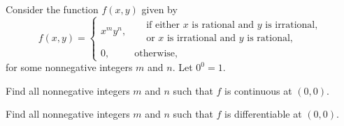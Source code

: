 \begin{problem}
Consider the function $f(x,y)$ given by
\[
f(x,y)=
\begin{cases}
x^m y^n, & \begin{aligned}&\text{if either $x$ is rational and $y$ is irrational,}\\[-0.15em]&\text{or $x$ is irrational and $y$ is rational,}\end{aligned}\\[0.8em]
0, & \text{otherwise},
\end{cases}
\]
for some nonnegative integers $m$ and $n$. Let $0^0=1$.
\begin{problemsubparts}
\item Find all nonnegative integers $m$ and $n$ such that $f$ is continuous at $(0,0)$.
\item Find all nonnegative integers $m$ and $n$ such that $f$ is differentiable at $(0,0)$.
\end{problemsubparts}
\end{problem}

